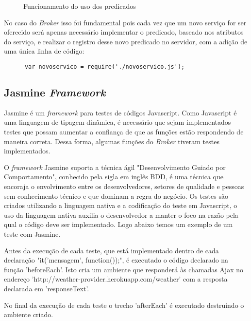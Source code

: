 \begin{figure}[h]
  \center
  \qquad
  \caption[Funcionamento do uso dos predicados]{Funcionamento do uso dos predicados}
  \label{fig:novosservicos}
\end{figure}

No caso do \textit{Broker} isso foi fundamental pois cada vez que um novo serviço for ser oferecido será apenas necessário implementar o predicado, baseado nos atributos do serviço, e realizar o registro desse novo predicado no servidor, com a adição de uma única linha de código:

\begin{verbatim}
      var novoservico = require('./novoservico.js');
\end{verbatim}

\subsection{Jasmine \normalfont\itshape Framework}
Jasmine é um \textit{framework} para testes de códigos Javascript. Como Javascript é uma linguagem de tipagem dinâmica, é necessário que sejam implementados testes que possam aumentar a confiança de que as funções estão respondendo de maneira correta.
Dessa forma, algumas funções do \textit{Broker} tiveram testes implementados.

O \textit{framework} Jasmine suporta a técnica ágil "Desenvolvimento Guiado por Comportamento", conhecido pela sigla em inglês BDD, é uma técnica que encoraja o envolvimento entre os desenvolvedores, setores de qualidade e pessoas sem conhecimento técnico e que dominam a regra do negócio. Os testes são criados utilizando a linguagem nativa e a codificação do teste em Javascript, o uso da linguagem nativa auxilia o desenvolvedor a manter o foco na razão pela qual o código deve ser implementado.
Logo abaixo temos um exemplo de um teste com Jasmine.

Antes da execução de cada teste, que está implementado dentro de cada declaração "it('mensagem', function(){});", é executado o código declarado na função 'beforeEach'. Isto cria um ambiente que responderá às chamadas Ajax no endereço 'http://weather-provider.herokuapp.com/weather' com a resposta declarada em 'responseText'.

No final da execução de cada teste o trecho 'afterEach' é executado destruindo o ambiente criado.

